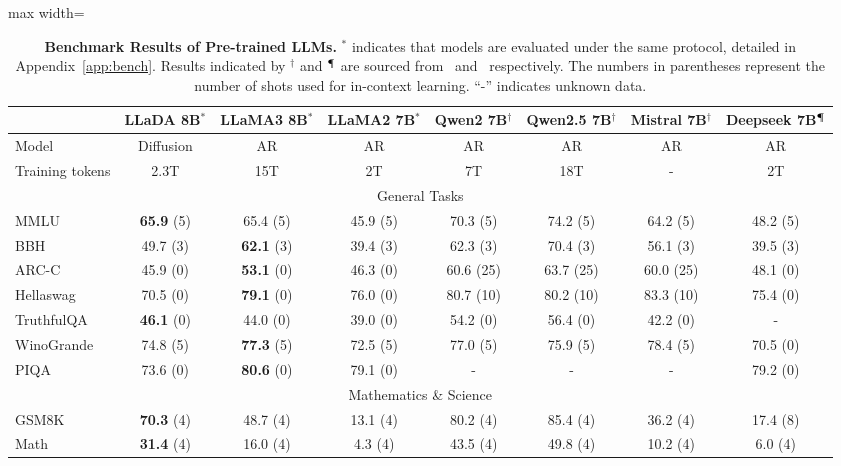 \documentclass{article}
\begin{document}
\begin{table}[t!]
    \centering
    \caption{\textbf{Benchmark Results of Pre-trained LLMs.} $^{*}$ indicates that models are evaluated under the same protocol, detailed in Appendix~\ref{app:bench}. Results indicated by $^{\dagger}$ and  $^{\mathparagraph}$ are sourced from~\citet{qwen2, qwen2.5} and~\citet{bi2024deepseek} respectively. The numbers in parentheses represent the number of shots used for in-context learning. ``-'' indicates unknown data.}
    \label{tab:base}
    \vspace{.2cm} 
    \begin{adjustbox}{max width=\textwidth}
    \begin{tabular}{l|ccc|cccc}
      \toprule
         & LLaDA 8B$^{*}$ & LLaMA3 8B$^{*}$ & LLaMA2 7B$^{*}$ &  Qwen2 7B$^{\dagger}$ & Qwen2.5 7B$^{\dagger}$ & Mistral 7B$^{\dagger}$ & Deepseek 7B$^{\mathparagraph}$  \\
      \midrule
      Model & Diffusion & AR & AR & AR & AR & AR & AR \\
      Training tokens & 2.3T & 15T & 2T & 7T & 18T & - & 2T \\
      \midrule
         \multicolumn{8}{c}{General Tasks}\\
      \midrule
          MMLU & \textbf{65.9} (5) & 65.4 (5) & 45.9 (5) & 70.3 (5) & 74.2 (5) & 64.2 (5) & 48.2 (5) \\
          BBH & 49.7 (3) & \textbf{62.1} (3) & 39.4 (3) & 62.3 (3) & 70.4 (3) & 56.1 (3) & 39.5 (3) \\
          ARC-C & 45.9 (0) & \textbf{53.1} (0) & 46.3 (0) & 60.6 (25) & 63.7 (25) & 60.0 (25) & 48.1 (0) \\
          Hellaswag & 70.5 (0) & \textbf{79.1} (0) & 76.0 (0) & 80.7 (10) & 80.2 (10) & 83.3 (10) & 75.4 (0) \\
          TruthfulQA & \textbf{46.1} (0) & 44.0 (0) & 39.0 (0) & 54.2 (0) & 56.4 (0) & 42.2 (0) & - \\ 
          WinoGrande & 74.8 (5) & \textbf{77.3} (5) & 72.5 (5) & 77.0 (5) & 75.9 (5) & 78.4 (5) & 70.5 (0) \\
          PIQA & 73.6 (0) & \textbf{80.6} (0) & 79.1 (0) & - & - & - & 79.2 (0) \\
      \midrule
        \multicolumn{8}{c}{Mathematics  \& Science}\\
      \midrule
        GSM8K & \textbf{70.3} (4) & 48.7 (4) & 13.1 (4) & 80.2 (4) & 85.4 (4) & 36.2 (4) & 17.4 (8) \\
        Math & \textbf{31.4} (4) & 16.0 (4) & 4.3 (4) & 43.5 (4) & 49.8 (4) & 10.2 (4) & 6.0 (4) \\

\end{tabular}
\end{adjustbox}
\end{table}
\end{document}
